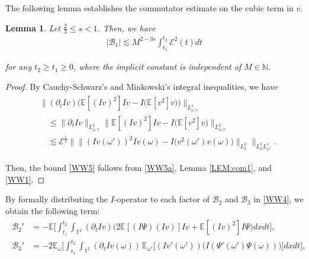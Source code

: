 \documentclass[letterpaper, 11pt,  reqno]{amsart}
\newtheorem{lemma}[theorem]{Lemma}
\newcommand{\1}{\hspace{0.5mm}\text{I}\hspace{0.2mm}}
\newcommand{\noi}{\noindent}
\newcommand{\T}{\mathbb{T}}
\newcommand{\N}{\mathbb{N}}
\newcommand{\E}{\mathbb{E}}
\newcommand{\dt}{\partial_t}
\newcommand{\les}{\lesssim}
\newcommand{\EE}{\mathcal{E}}
\newcommand{\B}{\mathcal{B}}
\renewcommand{\o}{\omega}
\numberwithin{equation}{section}
\numberwithin{theorem}{section}
\begin{document}
The following lemma establishes 
the  commutator estimate
on the cubic term in $v$.





\begin{lemma}
\label{LEM:CM1}
Let $\frac 23 \le s < 1$. Then, we have 
\begin{align} 
    | \B_1 | \les M^{2 - 3s} \int_{t_1}^{t_2} \EE^2 (t) d t
\label{WW5}
\end{align} 

\noi
for any $t_2 \ge t_1 \ge 0$, 
where the implicit constant is independent of $M \in \N$.

\end{lemma}

\begin{proof}
By Cauchy-Schwarz's and Minkowski's integral inequalities, we have
\begin{align}
\begin{split}
& \Big\|(\dt I v) \Big( \E [ (I v)^2 ] I v - I \big( \E [v^2] v \big)\Big) \Big\|_{L^1_{\o, x}}\\
& \quad 
\le 
\|\dt I v \|_{L^2_{\o, x}}
\big\| \E [ (I v)^2 ] I v - I \big( \E [v^2] v \big)\big\|_{L^2_{\o, x}}\\
& \quad 
\les \EE^\frac 12
\Big\| \|(I v(\o'))^2 I v(\o) - I \big( v^2(\o')  v(\o) \big) \|_{L^2_x}\Big\|_{L^2_{\o} L^1_{\o'}}.
\end{split}
\label{WW5a}
\end{align}

\noi
Then, the bound \eqref{WW5} 
follows
from \eqref{WW5a},
Lemma \ref{LEM:com1}, and \eqref{WW1}.
\end{proof}






By formally distributing the $I$-operator to each factor of $\B_2$ 
and $\B_3$ 
in \eqref{WW4}, 
we obtain the following term:
\begin{align} 
\begin{split}
\B_2' &  = -   \E \bigg[ \int_{t_1}^{t_2} \int_{\T^2} (\dt I v)
 \Big(  2 \E [ (I \Psi)( I v) ] I v  + \E [ (I v)^2] I \Psi  \Big) d x d t \bigg], \\
\B_3'  & =  - 2 \E_\o \bigg[ \int_{t_1}^{t_2} \int_{\T^2} (\dt I v(\o))\,
 \E_{\o'} \Big[ (I v'(\o')) \big(I  (\Psi' (\o') \Psi(\o)) \big)\Big] d x d t \bigg], 
\end{split} 
\label{WW6}
\end{align}  
\end{document}
